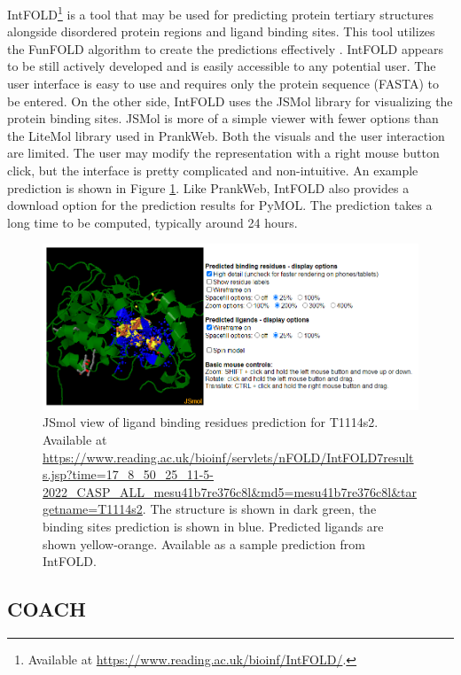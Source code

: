 IntFOLD\footnote{Available at \url{https://www.reading.ac.uk/bioinf/IntFOLD/}.} is a tool that may be used for predicting protein tertiary structures alongside disordered protein regions and ligand binding sites. This tool utilizes the FunFOLD algorithm to create the predictions effectively \cite{10.1093/nar/gkz322}. IntFOLD appears to be still actively developed and is easily accessible to any potential user. The user interface is easy to use and requires only the protein sequence (FASTA) to be entered. On the other side, IntFOLD uses the JSMol library for visualizing the protein binding sites. JSMol is more of a simple viewer with fewer options than the LiteMol library used in PrankWeb. Both the visuals and the user interaction are limited. The user may modify the representation with a right mouse button click, but the interface is pretty complicated and non-intuitive. An example prediction is shown in Figure \ref{fig:intfold_prediction}. Like PrankWeb, IntFOLD also provides a download option for the prediction results for PyMOL. The prediction takes a long time to be computed, typically around 24 hours.

\begin{figure}
    \centering
    \includegraphics[width=\linewidth]{img/intfold_prediction.png}
    \caption{JSmol view of ligand binding residues prediction for T1114s2.
    Available at \url{https://www.reading.ac.uk/bioinf/servlets/nFOLD/IntFOLD7results.jsp?time=17_8_50_25_11-5-2022_CASP_ALL_mesu41b7re376c8l&md5=mesu41b7re376c8l&targetname=T1114s2}. The structure is shown in dark green, the binding sites prediction is shown in blue. Predicted ligands are shown yellow-orange. Available as a sample prediction from IntFOLD.}
    \label{fig:intfold_prediction}
\end{figure}

\subsection{COACH}
\label{subsec:coach}

